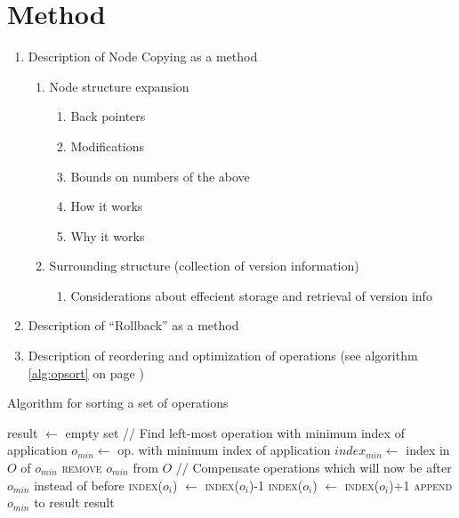 \chapter{Method}

\begin{enumerate}
  \item Description of Node Copying as a method
  \begin{enumerate}
    \item Node structure expansion
    \begin{enumerate}
      \item Back pointers
      \item Modifications
      \item Bounds on numbers of the above
      \item How it works
      \item Why it works
    \end{enumerate}
    \item Surrounding structure (collection of version information)
    \begin{enumerate}
      \item Considerations about effecient storage and retrieval of version info
    \end{enumerate}
  \end{enumerate}
  \item Description of ``Rollback'' as a method
  \item Description of reordering and optimization of operations (see algorithm \ref{alg:opsort} on page \pageref{alg:opsort})
\end{enumerate}

\begin{algorithm}[!h]
  \caption{Algorithm for sorting a set of operations}
  \label{alg:opsort}
  \begin{algorithmic}
      \State result $\gets$ empty set
        \State // Find left-most operation with minimum index of application
        \State $o_{min} \gets$ op. with minimum index of application
        \State $index_{min} \gets$ index in $O$ of $o_{min}$
        \State \textsc{remove} $o_{min}$ from $O$
        \Statex
        \State // Compensate operations which will now be after $o_{min}$ instead of before
            \State \textsc{index}($o_i$) $\gets$ \textsc{index}($o_i$)-1
          \EndFor
            \State \textsc{index}($o_i$) $\gets$ \textsc{index}($o_i$)+1
          \EndFor
        \EndIf
        \State \textsc{append} $o_{min}$ to result
      \EndWhile
      \Statex
      \State \Return result
    \EndFunction
  \end{algorithmic}
\end{algorithm}



